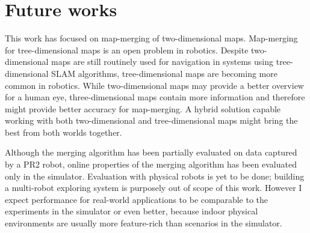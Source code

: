 \chapter{Future works}
\label{sec:future-works}

This work has focused on map-merging of two-dimensional maps. Map-merging for tree-dimensional maps is an open problem in robotics. Despite two-dimensional maps are still routinely used for navigation in systems using tree-dimensional \gls{SLAM} algorithms, tree-dimensional maps are becoming more common in robotics. While two-dimensional maps may provide a better overview for a human eye, three-dimensional maps contain more information and therefore might provide better accuracy for map-merging. A hybrid solution capable working with both two-dimensional and tree-dimensional maps might bring the best from both worlds together.

Although the merging algorithm has been partially evaluated on data captured by a PR2 robot, online properties of the merging algorithm has been evaluated only in the simulator. Evaluation with physical robots is yet to be done; building a multi-robot exploring system is purposely out of scope of this work. However I expect performance for real-world applications to be comparable to the experiments in the simulator or even better, because indoor physical environments are usually more feature-rich than scenarios in the simulator.
